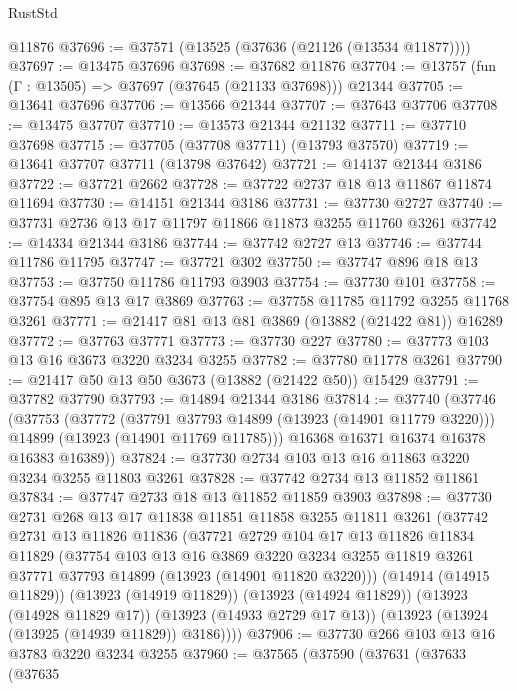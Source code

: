 \begin{lexlean}{RustStd}
\begin{coremodule}
    @11876
@37696 := @37571 (@13525 (@37636 (@21126 (@13534 @11877))))
@37697 := @13475 @37696
@37698 := @37682 @11876
@37704 := @13757 (fun (Γ : @13505) => @37697 (@37645 (@21133 @37698))) @21344
@37705 := @13641 @37696
@37706 := @13566 @21344
@37707 := @37643 @37706
@37708 := @13475 @37707
@37710 := @13573 @21344 @21132
@37711 := @37710 @37698
@37715 := @37705 (@37708 @37711) (@13793 @37570)
@37719 := @13641 @37707 @37711 (@13798 @37642)
@37721 := @14137 @21344 @3186
@37722 := @37721 @2662
@37728 := @37722 @2737 @18 @13 @11867 @11874 @11694
@37730 := @14151 @21344 @3186
@37731 := @37730 @2727
@37740 := @37731 @2736 @13 @17 @11797 @11866 @11873 @3255 @11760 @3261
@37742 := @14334 @21344 @3186
@37744 := @37742 @2727 @13
@37746 := @37744 @11786 @11795
@37747 := @37721 @302
@37750 := @37747 @896 @18 @13
@37753 := @37750 @11786 @11793 @3903
@37754 := @37730 @101
@37758 := @37754 @895 @13 @17 @3869
@37763 := @37758 @11785 @11792 @3255 @11768 @3261
@37771 := @21417 @81 @13 @81 @3869 (@13882 (@21422 @81)) @16289
@37772 := @37763 @37771
@37773 := @37730 @227
@37780 := @37773 @103 @13 @16 @3673 @3220 @3234 @3255
@37782 := @37780 @11778 @3261
@37790 := @21417 @50 @13 @50 @3673 (@13882 (@21422 @50)) @15429
@37791 := @37782 @37790
@37793 := @14894 @21344 @3186
@37814 := @37740
    (@37746
      (@37753
        (@37772
          (@37791 @37793 @14899 (@13923 (@14901 @11779 @3220)))
          @14899
          (@13923 (@14901 @11769 @11785)))
        @16368
        @16371
        @16374
        @16378
        @16383
        @16389))
@37824 := @37730 @2734 @103 @13 @16 @11863 @3220 @3234 @3255 @11803 @3261
@37828 := @37742 @2734 @13 @11852 @11861
@37834 := @37747 @2733 @18 @13 @11852 @11859 @3903
@37898 := @37730
    @2731
    @268
    @13
    @17
    @11838
    @11851
    @11858
    @3255
    @11811
    @3261
    (@37742
      @2731
      @13
      @11826
      @11836
      (@37721
        @2729
        @104
        @17
        @13
        @11826
        @11834
        @11829
        (@37754
          @103
          @13
          @16
          @3869
          @3220
          @3234
          @3255
          @11819
          @3261
          @37771
          @37793
          @14899
          (@13923 (@14901 @11820 @3220)))
        (@14914 (@14915 @11829))
        (@13923 (@14919 @11829))
        (@13923 (@14924 @11829))
        (@13923 (@14928 @11829 @17))
        (@13923 (@14933 @2729 @17 @13))
        (@13923 (@13924 (@13925 (@14939 @11829)) @3186))))
@37906 := @37730 @266 @103 @13 @16 @3783 @3220 @3234 @3255
@37960 := @37565
    (@37590
      (@37631
        (@37633
          (@37635

\end{coremodule}
\end{lexlean}

